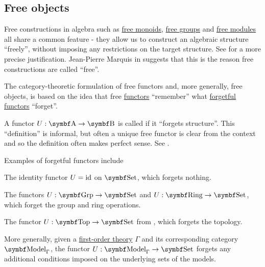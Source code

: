 \subsection{Free objects}\label{subsec:free_objects}

\begin{remark}\label{rem:free_construction_etymology}
  Free constructions in algebra such as \hyperref[def:free_monoid]{free monoids}, \hyperref[def:free_group]{free groups} and \hyperref[def:free_left_module]{free modules} all share a common feature - they allow us to construct an algebraic structure \enquote{freely}, without imposing any restrictions on the target structure. See  for a more precise justification. Jean-Pierre Marquis in \cite{StanfordPlato:category_theory} suggests that this is the reason free constructions are called \enquote{free}.

  The category-theoretic formulation of free functors and, more generally, free objects, is based on the idea that free \hyperref[def:free_functor]{functors} \enquote{remember} what \hyperref[def:forgetful_functor]{forgetful functors} \enquote{forget}.
\end{remark}

\begin{definition}\label{def:forgetful_functor}
  A functor \( U: \Cat{A} \to \Cat{B} \) is called  if it \enquote{forgets structure}. This \enquote{definition} is informal, but often a unique free functor is clear from the context and so the definition often makes perfect sense. See .
\end{definition}

\begin{example}\label{ex:forgetful_functors}
  Examples of forgetful functors include

  \begin{DefEnum}
    \item The identity functor \( U = \operatorname{id} \) on \( \Cat{Set} \), which forgets nothing.
    \item The functors \( U: \Cat{Grp} \to \Cat{Set} \) and \( U: \Cat{Ring} \to \Cat{Set} \), which forget the group and ring operations.
    \item The functor \( U: \Cat{Top} \to \Cat{Set} \) from , which forgets the topology.
    \item More generally, given a \hyperref[def:first_order_theory]{first-order theory} \( \Gamma \) and its corresponding category \( \Cat{Model}_\Gamma \), the functor \( U: \Cat{Model}_\Gamma \to \Cat{Set} \) forgets any additional conditions imposed on the underlying sets of the models.
  \end{DefEnum}
\end{example}

